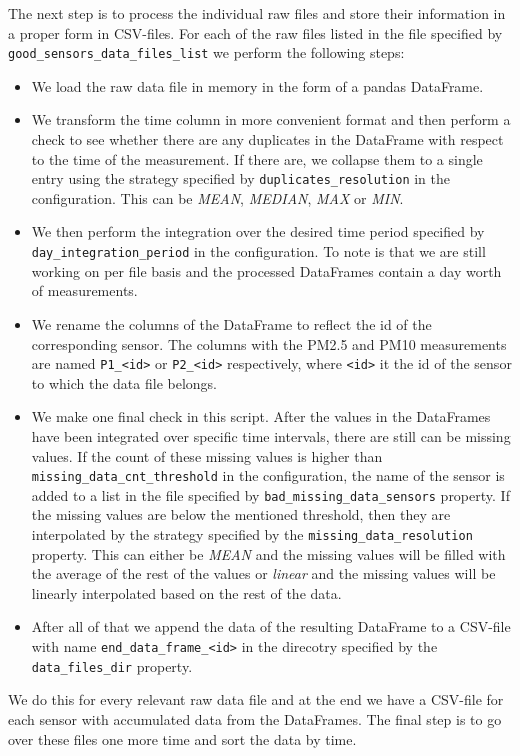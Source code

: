 \documentclass[12pt,a4paper,twoside]{scrartcl}
\numberwithin{equation}{section}
\begin{document}
The next step is to process the individual raw files and store their information in a proper form in CSV-files. For each of the raw files listed in the file specified by \texttt{good\_sensors\_data\_files\_list} we perform the following steps:
\begin{itemize}
\item We load the raw data file in memory in the form of a pandas DataFrame.
\item We transform the time column in more convenient format and then perform a check to see whether there are any duplicates in the DataFrame with respect to the time of the measurement. If there are, we collapse them to a single entry using the strategy specified by \texttt{duplicates\_resolution} in the configuration. This can be \emph{MEAN}, \emph{MEDIAN}, \emph{MAX} or \emph{MIN}. 
\item We then perform the integration over the desired time period specified by \texttt{day\_integration\_period} in the configuration. To note is that we are still working on per file basis and the processed DataFrames contain a day worth of measurements.
\item We rename the columns of the DataFrame to reflect the id of the corresponding sensor. The columns with the PM2.5 and PM10 measurements are named \texttt{P1\_<id>} or \texttt{P2\_<id>} respectively, where \texttt{<id>} it the id of the sensor to which the data file belongs.
\item We make one final check in this script. After the values in the DataFrames have been integrated over specific time intervals, there are still can be missing values. If the count of these missing values is higher than \texttt{missing\_data\_cnt\_threshold} in the configuration, the name of the sensor is added to a list in the file specified by \texttt{bad\_missing\_data\_sensors} property. If the missing values are below the mentioned threshold, then they are interpolated by the strategy specified by the \texttt{missing\_data\_resolution} property. This can either be \emph{MEAN} and the missing values will be filled with the average of the rest of the values or \emph{linear} and the missing values will be linearly interpolated based on the rest of the data.
\item After all of that we append the data of the resulting DataFrame to a CSV-file with name \texttt{end\_data\_frame\_<id>} in the direcotry specified by the \texttt{data\_files\_dir} property.
\end{itemize}
We do this for every relevant raw data file and at the end we have a CSV-file for each sensor with accumulated data from the DataFrames. The final step is to go over these files one more time and sort the data by time.
\end{document}
